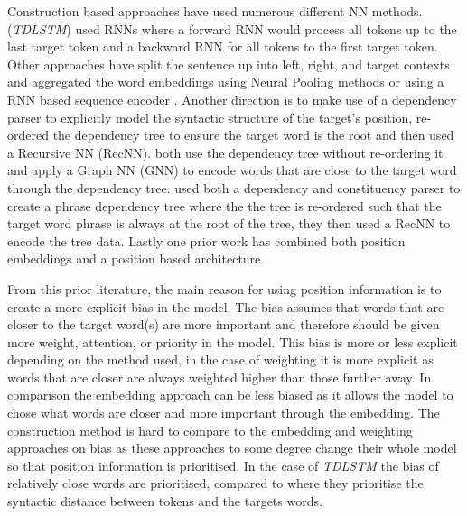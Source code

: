 Construction based approaches have used numerous different NN methods. \citet{tang-etal-2016-effective} (\textit{TDLSTM}) used RNNs where a forward RNN would process all tokens up to the last target token and a backward RNN for all tokens to the first target token. Other approaches have split the sentence up into left, right, and target contexts and aggregated the word embeddings using Neural Pooling methods \citep{vo2015target, zhang2016gated} or using a RNN based sequence encoder \citep{liu-zhang-2017-attention}. Another direction is to make use of a dependency parser to explicitly model the syntactic structure of the target's position, \citet{dong-etal-2014-adaptive} re-ordered the dependency tree to ensure the target word is the root and then used a Recursive NN (RecNN). \citet{sun-etal-2019-aspect, huang-carley-2019-syntax} both use the dependency tree without re-ordering it and apply a Graph NN (GNN) to encode words that are close to the target word through the dependency tree. \citet{nguyen-shirai-2015-phrasernn} used both a dependency and constituency parser to create a phrase dependency tree where the the tree is re-ordered such that the target word phrase is always at the root of the tree, they then used a RecNN to encode the tree data. Lastly one prior work has combined both position embeddings and a position based architecture \citep{sun-etal-2019-aspect}.

From this prior literature, the main reason for using position information is to create a more explicit bias in the model. The bias assumes that words that are closer to the target word(s) are more important and therefore should be given more weight, attention, or priority in the model. This bias is more or less explicit depending on the method used, in the case of weighting it is more explicit as words that are closer are always weighted higher than those further away. In comparison the embedding approach can be less biased as it allows the model to chose what words are closer and more important through the embedding. The construction method is hard to compare to the embedding and weighting approaches on bias as these approaches to some degree change their whole model so that position information is prioritised. In the case of \textit{TDLSTM} \citep{tang-etal-2016-effective} the bias of relatively close words are prioritised, compared to \citet{dong-etal-2014-adaptive} where they prioritise the syntactic distance between tokens and the targets words. 

